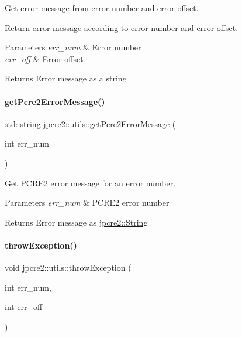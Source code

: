 Get error message from error number and error offset. 

Return error message according to error number and error offset.


\begin{DoxyParams}{Parameters}
{\em err\+\_\+num} & Error number \\
\hline
{\em err\+\_\+off} & Error offset \\
\hline
\end{DoxyParams}
\begin{DoxyReturn}{Returns}
Error message as a string 
\end{DoxyReturn}
\hypertarget{namespacejpcre2_1_1utils_a6f28489b48095eeaacfaa43a0a8e87a6_a6f28489b48095eeaacfaa43a0a8e87a6}{}\label{namespacejpcre2_1_1utils_a6f28489b48095eeaacfaa43a0a8e87a6_a6f28489b48095eeaacfaa43a0a8e87a6} 
\paragraph{\texorpdfstring{get\+Pcre2\+Error\+Message()}{getPcre2ErrorMessage()}}
{\footnotesize\ttfamily std\+::string jpcre2\+::utils\+::get\+Pcre2\+Error\+Message (\begin{DoxyParamCaption}\item[{int}]{err\+\_\+num }\end{DoxyParamCaption})}



Get P\+C\+R\+E2 error message for an error number. 


\begin{DoxyParams}{Parameters}
{\em err\+\_\+num} & P\+C\+R\+E2 error number \\
\hline
\end{DoxyParams}
\begin{DoxyReturn}{Returns}
Error message as \hyperlink{namespacejpcre2_a91f03070152fb228bc116c5a737f1d16}{jpcre2\+::\+String} 
\end{DoxyReturn}
\hypertarget{namespacejpcre2_1_1utils_a71c7842918bdcc6936266813981492dc_a71c7842918bdcc6936266813981492dc}{}\label{namespacejpcre2_1_1utils_a71c7842918bdcc6936266813981492dc_a71c7842918bdcc6936266813981492dc} 
\paragraph{\texorpdfstring{throw\+Exception()}{throwException()}}
{\footnotesize\ttfamily void jpcre2\+::utils\+::throw\+Exception (\begin{DoxyParamCaption}\item[{int}]{err\+\_\+num,  }\item[{int}]{err\+\_\+off }\end{DoxyParamCaption})}



